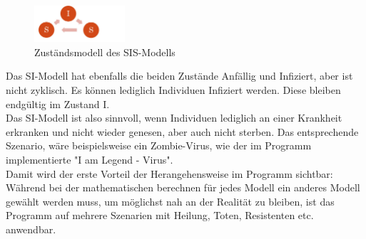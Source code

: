 \begin{figure}
\includegraphics[width= 0.3\textwidth]{./images/SIS-Modell.jpg}\caption{Zuständsmodell des SIS-Modells}
\end{figure}
Das SI-Modell hat ebenfalls die beiden Zustände Anfällig und Infiziert, aber ist nicht zyklisch. Es können lediglich Individuen Infiziert werden. Diese bleiben endgültig im Zustand I.\\ 
Das SI-Modell ist also sinnvoll, wenn Individuen lediglich an einer Krankheit erkranken und nicht wieder genesen, aber auch nicht sterben. Das entsprechende Szenario, wäre beispielsweise ein Zombie-Virus, wie der im Programm implementierte "I am Legend - Virus".\\
Damit wird der erste Vorteil der Herangehensweise im Programm sichtbar: Während bei der mathematischen berechnen für jedes Modell ein anderes Modell gewählt werden muss, um möglichst nah an der Realität zu bleiben, ist das Programm auf mehrere Szenarien mit Heilung, Toten, Resistenten etc. anwendbar.